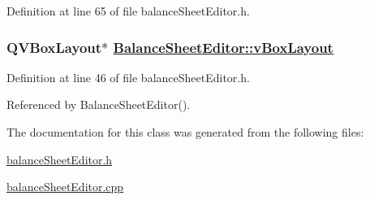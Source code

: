 Definition at line 65 of file balance\-Sheet\-Editor.h.\hypertarget{classBalanceSheetEditor_r3}{
\subsubsection[vBoxLayout]{\setlength{\rightskip}{0pt plus 5cm}QVBox\-Layout$\ast$ \hyperlink{classBalanceSheetEditor_r3}{Balance\-Sheet\-Editor::v\-Box\-Layout}}}
\label{classBalanceSheetEditor_r3}


Definition at line 46 of file balance\-Sheet\-Editor.h.

Referenced by Balance\-Sheet\-Editor().

The documentation for this class was generated from the following files:\begin{CompactItemize}
\item 
\hyperlink{balanceSheetEditor_8h}{balance\-Sheet\-Editor.h}\item 
\hyperlink{balanceSheetEditor_8cpp}{balance\-Sheet\-Editor.cpp}\end{CompactItemize}
